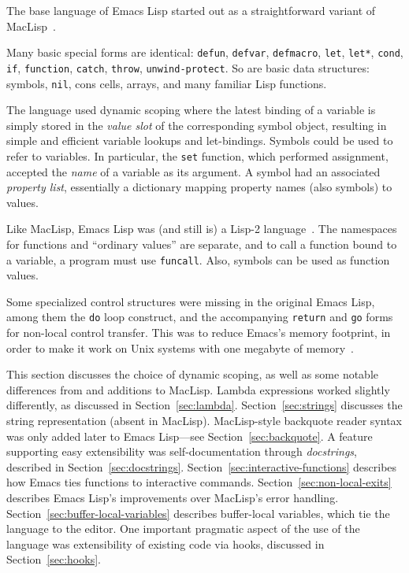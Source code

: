\documentclass[format=acmsmall, review]{acmart}
\newcommand \Elisp {Emacs Lisp}
\begin{document}
The base language of \Elisp{} started out as a straightforward
variant of MacLisp~\cite{Moon1974,Pitman1983}.

Many basic special forms are identical: \texttt{defun},
\texttt{defvar}, \texttt{defmacro}, \texttt{let}, \texttt{let*},
\texttt{cond}, \texttt{if}, \texttt{function}, \texttt{catch}, \texttt{throw},
\texttt{unwind-protect}.  So are basic data structures: symbols,
\texttt{nil}, cons cells, arrays, and many familiar Lisp
functions.

The language used dynamic scoping where the latest binding of a variable is
simply stored in the \emph{value slot} of the corresponding symbol object,
resulting in simple and efficient variable lookups and let-bindings.
Symbols could be used to refer to variables.  In particular, the
\texttt{set} function, which performed assignment, accepted the
\emph{name} of a variable as its argument.  A symbol had an associated
\emph{property list}, essentially a dictionary mapping property
names (also symbols) to values.

Like MacLisp, \Elisp{} was (and still is) a
Lisp-2 language~\cite{SteeleGabriel1993}.  The namespaces for functions and
``ordinary values'' are separate, and to call a function bound to a
variable, a program must use \texttt{funcall}.  Also, symbols can be
used as function values.

Some specialized control structures were missing in the original
\Elisp{}, among them the \texttt{do} loop construct, and the
accompanying \texttt{return} and \texttt{go} forms for non-local
control transfer.  This was to reduce Emacs's memory footprint, in
order to make it work on Unix systems with one megabyte of memory~\cite{Stallman2018-personal}.

This section discusses the choice of dynamic scoping, as well as
some notable differences from and additions to
MacLisp.  Lambda expressions worked slightly differently, as discussed
in Section~\ref{sec:lambda}.  Section~\ref{sec:strings} discusses the
string representation (absent in MacLisp).
MacLisp-style backquote reader syntax was only added later to \Elisp{}---see Section~\ref{sec:backquote}.
A feature supporting easy extensibility was self-documentation
through \emph{docstrings}, described in
Section~\ref{sec:docstrings}.
Section~\ref{sec:interactive-functions} describes how Emacs ties
functions to interactive commands.
Section~\ref{sec:non-local-exits} describes \Elisp{}'s improvements
over MacLisp's error handling.
Section~\ref{sec:buffer-local-variables} describes buffer-local
variables, which tie the language to the editor.  One important
pragmatic aspect of the use of the language was extensibility of
existing code via hooks, discussed in Section~\ref{sec:hooks}.
\end{document}
